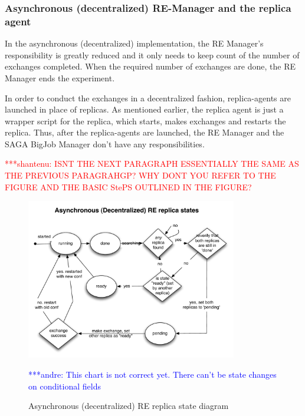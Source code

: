 \documentclass{rspublic}
\newcommand{\jhanote}[1]{ {\textcolor{red} { ***shantenu: #1 }}}
\newcommand{\alnote}[1]{ {\textcolor{blue} { ***andre: #1 }}}
\newcommand{\alnote}[1]{}
\newcommand{\jhanote}[1]{}
\begin{document}

\subsubsection{Asynchronous (decentralized) RE-Manager and the replica agent}

In the asynchronous (decentralized) implementation, the RE Manager's responsibility is greatly reduced and it only needs to keep count of the number of exchanges completed. When the required number of exchanges are done, the RE Manager ends the experiment. 

In order to conduct the exchanges in a decentralized fashion, replica-agents are launched in place of replicas. As mentioned earlier, the replica agent is just a wrapper script for the replica, which starts, makes exchanges and restarts the replica. Thus, after the replica-agents are launched, the RE Manager and the SAGA BigJob Manager don't have any responsibilities.  

\jhanote{ISNT THE NEXT PARAGRAPH ESSENTIALLY THE SAME AS THE PREVIOUS
  PARAGRAHGP? WHY DONT YOU REFER TO THE FIGURE AND THE BASIC StePS
  OUTLINED IN THE FIGURE?}
  
\begin{figure}[t]
      \centering
          \includegraphics[width=0.82\textwidth]{../figures/decent_state.pdf}
          \caption{\footnotesize Asynchronous (decentralized) RE replica state diagram
              } \alnote{This chart is not correct yet. There can't be state changes on conditional fields}
      \label{fig:state}
\end{figure}
\end{document}
